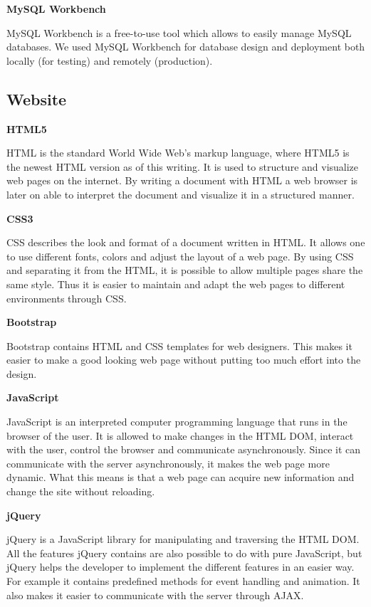 \textbf{MySQL Workbench}

MySQL Workbench is a free-to-use tool which allows to easily manage MySQL databases.
We used MySQL Workbench for database design and deployment both locally (for testing) and remotely (production).


\subsection{Website}

\textbf{HTML5}

HTML is the standard World Wide Web's markup language, where HTML5 is the newest HTML version as of this writing.
It is used to structure and visualize web pages on the internet.
By writing a document with HTML a web browser is later on able to interpret the document and visualize it in a structured manner. \cite{HTML5}

\textbf{CSS3}

CSS describes the look and format of a document written in HTML.
It allows one to use different fonts, colors and adjust the layout of a web page.
By using CSS and separating it from the HTML, it is possible to allow multiple pages share the same style.
Thus it is easier to maintain and adapt the web pages to different environments through CSS. \cite{CSS3}

\textbf{Bootstrap}

Bootstrap contains HTML and CSS templates for web designers.
This makes it easier to make a good looking web page without putting too much effort into the design. \cite{Bootstrap}

\textbf{JavaScript}

JavaScript is an interpreted computer programming language that runs in the browser of the user.
It is allowed to make changes in the HTML DOM, interact with the user, control the browser and communicate asynchronously.
Since it can communicate with the server asynchronously, it makes the web page more dynamic.
What this means is that a web page can acquire new information and change the site without reloading. \cite{JavaScript}

\textbf{jQuery}

jQuery is a JavaScript library for manipulating and traversing the HTML DOM.
All the features jQuery contains are also possible to do with pure JavaScript, but jQuery helps the developer to
implement the different features in an easier way.
For example it contains predefined methods for event handling and animation.
It also makes it easier to communicate with the server through AJAX. \cite{jQuery}


